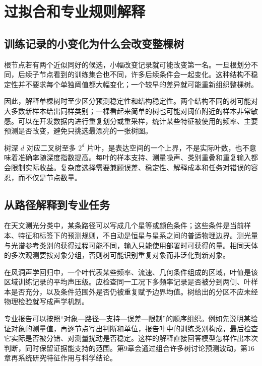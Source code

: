 \section{过拟合和专业规则解释}
\subsection{训练记录的小变化为什么会改变整棵树}
根节点若有两个近似同好的候选，小幅改变记录就可能改变第一名。一旦根划分不同，后续子节点看到的训练集合也不同，许多后续条件会一起变化。这种结构不稳定性并不要求每个单独阈值都大幅变化；一个较早的差异就可能重新组织整棵树。

因此，解释单棵树时至少区分预测稳定性和结构稳定性。两个结构不同的树可能对大多数新样本给出同样类别；一棵看起来简单的树也可能对阈值附近的样本非常敏感。可以在开发数据内进行重复划分或重采样，统计某些特征被使用的频率、主要预测是否改变，避免只挑选最漂亮的一张树图。

树深 $d$ 对应二叉树至多 $2^d$ 片叶，是表达空间的一个上界，不是实际叶数，也不意味着准确率随深度指数提高。每叶的样本支持、测量噪声、类别重叠和重复输入都会限制实际收益。复杂度选择需要兼顾误差、稳定性、解释成本和任务对错误的容忍，而不仅是节点数量。

\subsection{从路径解释到专业任务}
在天文测光分类中，某条路径可以写成几个星等或颜色条件；这些条件是当前样本、特征和标签下的预测规则，不自动是恒星与星系之间的普适物理边界。测光量与光谱参考类别的获得过程可能不同，输入只能使用部署时可获得的量。相同天体的多次观测要按对象分组，否则树可能识别重复对象而非泛化到新对象。

在风洞声学回归中，一个叶代表某些频率、流速、几何条件组成的区域，叶值是该区域训练记录的平均声压级。应检查同一工况下多频率记录是否被分到两侧、叶样本是否充分，以及条件范围外是否仍被重复赋予边界均值。树给出的分区不应未经物理检验就写成声学机制。

专业报告可以按照“对象—路径—支持—误差—限制”的顺序组织。例如先说明某验证对象的测量值，再逐节点写出判断和单位，报告叶中的训练类别构成，最后检查它实际是否被分错、对测量扰动是否稳定。这样的解释直接回答模型怎样作出本次判断，同时保留证据能支持的范围。第9章会通过组合许多树讨论预测波动，第16章再系统研究特征作用与科学结论。

